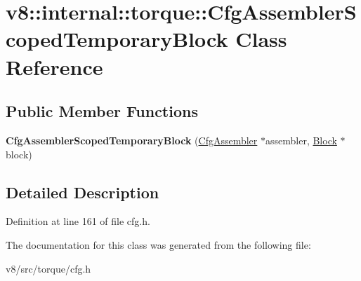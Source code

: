 \hypertarget{classv8_1_1internal_1_1torque_1_1CfgAssemblerScopedTemporaryBlock}{}\section{v8\+:\+:internal\+:\+:torque\+:\+:Cfg\+Assembler\+Scoped\+Temporary\+Block Class Reference}
\label{classv8_1_1internal_1_1torque_1_1CfgAssemblerScopedTemporaryBlock}
\subsection*{Public Member Functions}
\begin{DoxyCompactItemize}
\item 
\mbox{\label{classv8_1_1internal_1_1torque_1_1CfgAssemblerScopedTemporaryBlock_a40b6d8ac04aa16581f7301ea9564d514}} 
{\bfseries Cfg\+Assembler\+Scoped\+Temporary\+Block} (\mbox{\hyperlink{classv8_1_1internal_1_1torque_1_1CfgAssembler}{Cfg\+Assembler}} $\ast$assembler, \mbox{\hyperlink{classv8_1_1internal_1_1torque_1_1Block}{Block}} $\ast$block)
\end{DoxyCompactItemize}


\subsection{Detailed Description}


Definition at line 161 of file cfg.\+h.



The documentation for this class was generated from the following file\+:\begin{DoxyCompactItemize}
\item 
v8/src/torque/cfg.\+h\end{DoxyCompactItemize}
